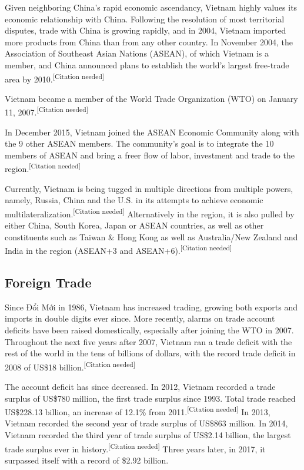 \documentclass{article}
\begin{document}
Given neighboring China's rapid economic ascendancy, Vietnam highly values its economic relationship with China. Following the resolution of most territorial disputes, trade with China is growing rapidly, and in 2004, Vietnam imported more products from China than from any other country. In November 2004, the Association of Southeast Asian Nations (ASEAN), of which Vietnam is a member, and China announced plans to establish the world's largest free-trade area by 2010.\textsuperscript{[Citation needed]}

Vietnam became a member of the World Trade Organization (WTO) on January 11, 2007.\textsuperscript{[Citation needed]}

In December 2015, Vietnam joined the ASEAN Economic Community along with the 9 other ASEAN members. The community's goal is to integrate the 10 members of ASEAN and bring a freer flow of labor, investment and trade to the region.\textsuperscript{[Citation needed]}

Currently, Vietnam is being tugged in multiple directions from multiple powers, namely, Russia, China and the U.S. in its attempts to achieve economic multilateralization.\textsuperscript{[Citation needed]} Alternatively in the region, it is also pulled by either China, South Korea, Japan or ASEAN countries, as well as other constituents such as Taiwan \& Hong Kong as well as Australia/New Zealand and India in the region (ASEAN+3 and ASEAN+6).\textsuperscript{[Citation needed]}

\subsection*{Foreign Trade}
Since Đổi Mới in 1986, Vietnam has increased trading, growing both exports and imports in double digits ever since. More recently, alarms on trade account deficits have been raised domestically, especially after joining the WTO in 2007. Throughout the next five years after 2007, Vietnam ran a trade deficit with the rest of the world in the tens of billions of dollars, with the record trade deficit in 2008 of US\$18 billion.\textsuperscript{[Citation needed]}

The account deficit has since decreased. In 2012, Vietnam recorded a trade surplus of US\$780 million, the first trade surplus since 1993. Total trade reached US\$228.13 billion, an increase of 12.1\% from 2011.\textsuperscript{[Citation needed]} In 2013, Vietnam recorded the second year of trade surplus of US\$863 million. In 2014, Vietnam recorded the third year of trade surplus of US\$2.14 billion, the largest trade surplus ever in history.\textsuperscript{[Citation needed]} Three years later, in 2017, it surpassed itself with a record of \$2.92 billion.
\end{document}
